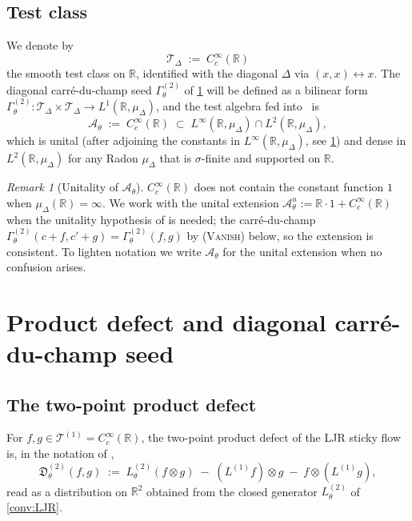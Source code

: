 \documentclass[11pt,reqno]{amsart}
\theoremstyle{plain}
\theoremstyle{definition}
\theoremstyle{remark}
\newtheorem{remark}[theorem]{Remark}
\newcommand{\R}{\mathbb{R}}
\newcommand{\cA}{\mathcal A}
\newcommand{\cT}{\mathcal T}
\begin{document}
\subsection{Test class}\label{sec:LJR-testclass}

We denote by
\[
  \cT_{\Delta}\;:=\;C_{c}^{\infty}(\R)
\]
the smooth test class on $\R$, identified with the diagonal
$\Delta$ via $(x,x)\leftrightarrow x$. The diagonal carr\'e-du-champ
seed $\Gamma^{(2)}_{\theta}$ of \cref{sec:product-defect} will
be defined as a bilinear form
$\Gamma^{(2)}_{\theta}\colon\cT_{\Delta}\times\cT_{\Delta}\to L^{1}(\R,\mu_{\Delta})$,
and the test algebra fed into~\cite{GammaHierarchyDivergence} is
\begin{equation}\label{eq:test-algebra}
  \cA_{\theta}\;:=\;C_{c}^{\infty}(\R)\;\subset\;L^{\infty}(\R,\mu_{\Delta})\cap L^{2}(\R,\mu_{\Delta}),
\end{equation}
which is unital (after adjoining the constants in
$L^{\infty}(\R,\mu_{\Delta})$, see \cref{rem:unital}) and dense
in $L^{2}(\R,\mu_{\Delta})$ for any Radon $\mu_{\Delta}$ that is
$\sigma$-finite and supported on $\R$.

\begin{remark}[Unitality of $\cA_{\theta}$]\label{rem:unital}
$C_{c}^{\infty}(\R)$ does not contain the constant function $1$
when $\mu_{\Delta}(\R)=\infty$. We work with the unital
extension $\cA_{\theta}^{u}:=\R\cdot 1+C_{c}^{\infty}(\R)$ when
the unitality hypothesis of \cite[\S 2]{GammaHierarchyDivergence}
is needed; the carr\'e-du-champ
$\Gamma^{(2)}_{\theta}(c+f,c'+g)=\Gamma^{(2)}_{\theta}(f,g)$ by
\textsc{(Vanish)} below, so the extension is consistent. To
lighten notation we write $\cA_{\theta}$ for the unital extension
when no confusion arises.
\end{remark}

\section{Product defect and diagonal carr\'e-du-champ seed}\label{sec:product-defect}

\subsection{The two-point product defect}\label{sec:Dgamma}

For $f,g\in\cT^{(1)}=C_{c}^{\infty}(\R)$, the two-point product
defect of the LJR sticky flow is, in the notation of
\cite[Def.~6.7]{PrimitiveDivergence},
\begin{equation}\label{eq:Dgamma-def}
  \mathfrak D^{(2)}_{\theta}(f,g)
  \;:=\;
  L^{(2)}_{\theta}(f\otimes g)\;-\;(L^{(1)}f)\otimes g\;-\;f\otimes(L^{(1)}g),
\end{equation}
read as a distribution on $\R^{2}$ obtained from the closed
generator $L^{(2)}_{\theta}$ of \cref{conv:LJR}.
\end{document}

